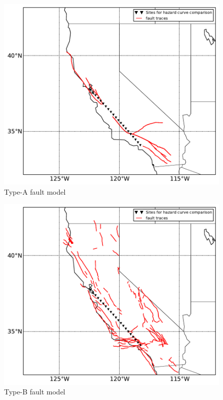 \begin{figure}[!hb]
\centering
\includegraphics[width=12cm]{./qareport/pictures/aFault_aPriori_D2pt1.pdf}
\caption{Type-A fault model}
\label{fig:type_a_fault}
\end{figure}

\begin{figure}[!hb]
\centering
\includegraphics[width=12cm]{./qareport/pictures/bFault_stitched_D2pt1_GR0.pdf}
\caption{Type-B fault model}
\label{fig:type_b_fault}
\end{figure}

